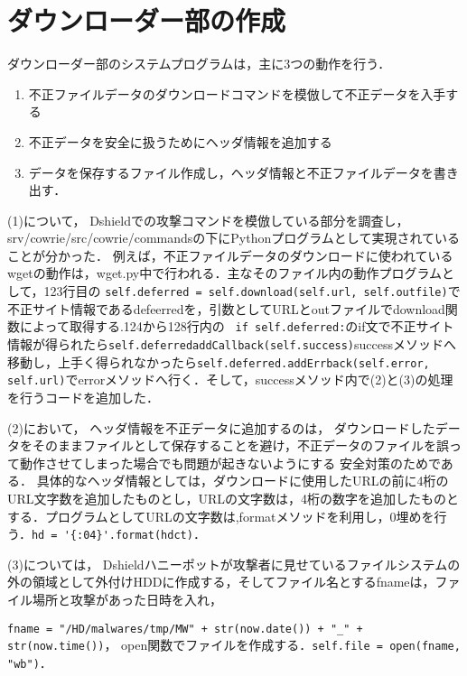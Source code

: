 \documentclass[dvipdfmx]{bta}
\begin{document}
\chapter{ダウンローダー部の作成}
ダウンローダー部のシステムプログラムは，主に3つの動作を行う．

\renewcommand{\labelenumi}{(\arabic{enumi})}
\begin{enumerate}
	\item 不正ファイルデータのダウンロードコマンドを模倣して不正データを入手する
	\item 不正データを安全に扱うためにヘッダ情報を追加する
	\item データを保存するファイル作成し，ヘッダ情報と不正ファイルデータを書き出す．
\end{enumerate}

(1)について，
Dshieldでの攻撃コマンドを模倣している部分を調査し，
srv/cowrie/src/cowrie/commandsの下にPythonプログラムとして実現されていることが分かった．
例えば，不正ファイルデータのダウンロードに使われているwgetの動作は，wget.py中で行われる．主なそのファイル内の動作プログラムとして，123行目の
\verb!self.deferred = self.download(self.url, self.outfile)!で不正サイト情報であるdefeerredを，引数としてURLとoutファイルでdownload関数によって取得する.124から128行内の
\verb! if self.deferred:!のif文で不正サイト情報が得られたら\verb!self.deferredaddCallback(self.success)!successメソッドへ移動し，上手く得られなかったら\verb!self.deferred.addErrback(self.error, self.url)!でerrorメソッドへ行く．そして，successメソッド内で(2)と(3)の処理を行うコードを追加した．

(2)において，
ヘッダ情報を不正データに追加するのは，
ダウンロードしたデータをそのままファイルとして保存することを避け，不正データのファイルを誤って動作させてしまった場合でも問題が起きないようにする
安全対策のためである．
具体的なヘッダ情報としては，ダウンロードに使用したURLの前に4桁のURL文字数を追加したものとし，URLの文字数は，4桁の数字を追加したものとする．プログラムとしてURLの文字数は,formatメソッドを利用し，0埋めを行う．\verb!hd = '{:04}'.format(hdct)!．

(3)については，
Dshieldハニーポットが攻撃者に見せているファイルシステムの外の領域として外付けHDDに作成する，そしてファイル名とするfnameは，ファイル場所と攻撃があった日時を入れ，

\verb!fname = "/HD/malwares/tmp/MW" + str(now.date()) + "_" + str(now.time())!，
open関数でファイルを作成する．\verb!self.file = open(fname, "wb")!．
\end{document}
